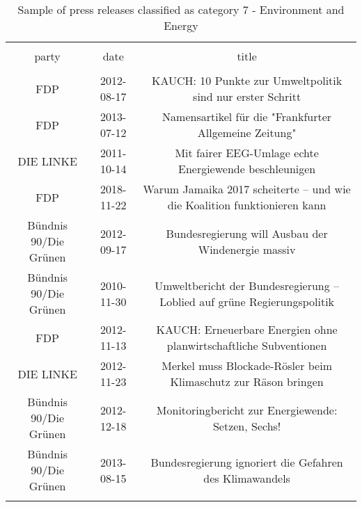
\begin{table*}[!htbp] \centering 
  \caption{Sample of press releases classified as category 7 - Environment and Energy} 
  \label{tab:7-document-samples} 
\begin{tabular}{@{\extracolsep{5pt}} ccc} 
\\[-1.8ex]\hline 
\hline \\[-1.8ex] 
party & date & title \\ 
\hline \\[-1.8ex] 
FDP & 2012-08-17 & KAUCH: 10 Punkte zur Umweltpolitik sind nur erster Schritt \\ 
FDP & 2013-07-12 & Namensartikel für die "Frankfurter Allgemeine Zeitung" \\ 
DIE LINKE & 2011-10-14 & Mit fairer EEG-Umlage echte Energiewende beschleunigen \\ 
FDP & 2018-11-22 & Warum Jamaika 2017 scheiterte – und wie die Koalition funktionieren kann \\ 
Bündnis 90/Die Grünen & 2012-09-17 & Bundesregierung will Ausbau der Windenergie massiv \\ 
Bündnis 90/Die Grünen & 2010-11-30 & Umweltbericht der Bundesregierung – Loblied auf grüne Regierungspolitik \\ 
FDP & 2012-11-13 & KAUCH: Erneuerbare Energien ohne planwirtschaftliche Subventionen \\ 
DIE LINKE & 2012-11-23 & Merkel muss Blockade-Rösler beim Klimaschutz zur Räson bringen \\ 
Bündnis 90/Die Grünen & 2012-12-18 & Monitoringbericht zur Energiewende: Setzen, Sechs! \\ 
Bündnis 90/Die Grünen & 2013-08-15 & Bundesregierung ignoriert die Gefahren des Klimawandels \\ 
\hline \\[-1.8ex] 
\end{tabular} 
\end{table*} 
